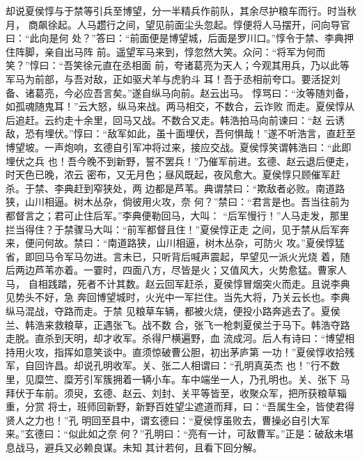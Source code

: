 却说夏侯惇与于禁等引兵至博望，分一半精兵作前队，其余尽护粮车而行。时当秋月，
商飙徐起。人马趱行之间，望见前面尘头忽起。惇便将人马摆开，问向导官曰：“此向是何
处？”答曰：“前面便是博望城，后面是罗川口。”惇令于禁、李典押住阵脚，亲自出马阵
前。遥望军马来到，惇忽然大笑。众问：“将军为何而笑？”惇曰：“吾笑徐元直在丞相面
前，夸诸葛亮为天人；今观其用兵，乃以此等军马为前部，与吾对敌，正如驱犬羊与虎豹斗
耳！吾于丞相前夸口。要活捉刘备、诸葛亮，今必应吾言矣。”遂自纵马向前。赵云出马。
惇骂曰：“汝等随刘备，如孤魂随鬼耳！”云大怒，纵马来战。两马相交，不数合，云诈败
而走。夏侯惇从后追赶。云约走十余里，回马又战。不数合又走。韩浩拍马向前谏曰：“赵
云诱敌，恐有埋伏。”惇曰：“敌军如此，虽十面埋伏，吾何惧哉！”遂不听浩言，直赶至
博望坡。一声炮响，玄德自引军冲将过来，接应交战。夏侯惇笑谓韩浩曰：“此即埋伏之兵
也！吾今晚不到新野，誓不罢兵！”乃催军前进。玄德、赵云退后便走，时天色已晚，浓云
密布，又无月色；昼风既起，夜风愈大。夏侯惇只顾催军赶杀。于禁、李典赶到窄狭处，两
边都是芦苇。典谓禁曰：“欺敌者必败。南道路狭，山川相逼。树木丛杂，倘彼用火攻，奈
何？”禁曰：“君言是也。吾当往前为都督言之；君可止住后军。”李典便勒回马，大叫：
“后军慢行！”人马走发，那里拦当得住？于禁骤马大叫：“前军都督且住！”夏侯惇正走
之间，见于禁从后军奔来，便问何故。禁曰：“南道路狭，山川相逼，树木丛杂，可防火
攻。”夏侯惇猛省，即回马令军马勿进。言未已，只听背后喊声震起，早望见一派火光烧
着，随后两边芦苇亦着。一霎时，四面八方，尽皆是火；又值风大，火势愈猛。曹家人马，
自相践踏，死者不计其数。赵云回军赶杀，夏侯惇冒烟突火而走。且说李典见势头不好，急
奔回博望城时，火光中一军拦住。当先大将，乃关云长也。李典纵马混战，夺路而走。于禁
见粮草车辆，都被火烧，便投小路奔逃去了。夏侯兰、韩浩来救粮草，正遇张飞。战不数
合，张飞一枪刺夏侯兰于马下。韩浩夺路走脱。直杀到天明，却才收军。杀得尸横遍野，血
流成河。后人有诗曰：“博望相持用火攻，指挥如意笑谈中。直须惊破曹公胆，初出茅庐第
一功！”夏侯惇收拾残军，自回许昌。却说孔明收军。关、张二人相谓曰：“孔明真英杰
也！”行不数里，见糜竺、糜芳引军簇拥着一辆小车。车中端坐一人，乃孔明也。关、张下
马拜伏于车前。须臾，玄德、赵云、刘封、关平等皆至，收聚众军，把所获粮草辎重，分赏
将士，班师回新野，新野百姓望尘遮道而拜，曰：“吾属生全，皆使君得贤人之力也！”孔
明回至县中，谓玄德曰：“夏侯惇虽败去，曹操必自引大军来。”玄德曰：“似此如之奈
何？”孔明曰：“亮有一计，可敌曹军。”正是：破敌未堪息战马，避兵又必赖良谋。未知
其计若何，且看下回分解。